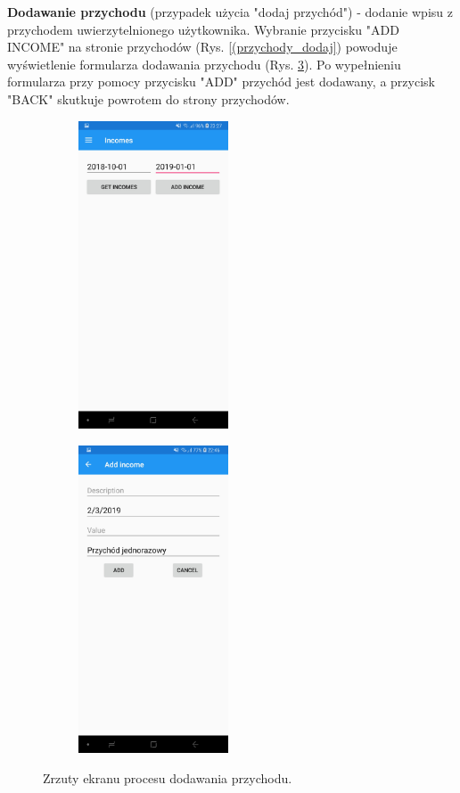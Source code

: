 \textbf{Dodawanie przychodu} (przypadek użycia "dodaj przychód") - dodanie wpisu z przychodem uwierzytelnionego użytkownika. Wybranie przycisku "ADD INCOME" na stronie przychodów (Rys. \ref{(przychody_dodaj}) powoduje wyświetlenie formularza dodawania przychodu (Rys. \ref{dodaj_przychod}). Po wypełnieniu formularza przy pomocy przycisku "ADD" przychód jest dodawany, a przycisk "BACK" skutkuje powrotem do strony przychodów.
\begin{figure}[!ht]
	\begin{center}
		\begin{subfigure}[b]{0.3\textwidth}
			\includegraphics[width=1.75in]{img/mobile/przychody.jpg}
			\label{przychody_dodaj}
		\end{subfigure}
		\begin{subfigure}[b]{0.3\textwidth}
			\includegraphics[width=1.75in]{img/mobile/dodaj_przychod.jpg}
			\label{dodaj_przychod}
		\end{subfigure}
	\end{center}
	\caption{Zrzuty ekranu procesu dodawania przychodu.}
\end{figure}

